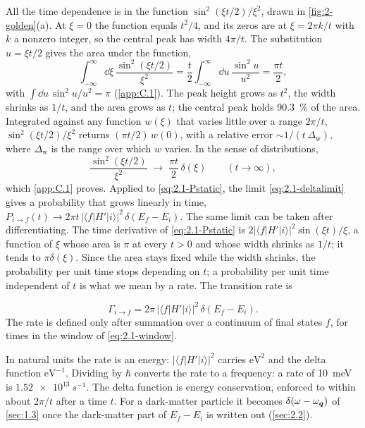 All the time dependence is in the function $\sin^2(\xi t/2)/\xi^2$, drawn in \cref{fig:2-golden}(a). At $\xi = 0$ the function equals $t^2/4$, and its zeros are at $\xi = 2\pi k/t$ with $k$ a nonzero integer, so the central peak has width $4\pi/t$. The substitution $u = \xi t/2$ gives the area under the function,
\begin{equation*}
  \int_{-\infty}^{\infty}\dd\xi\,\frac{\sin^2(\xi t/2)}{\xi^2} = \frac{t}{2}\int_{-\infty}^{\infty}\dd u\,\frac{\sin^2 u}{u^2} = \frac{\pi t}{2} ,
\end{equation*}
with $\int\dd u\,\sin^2u/u^2 = \pi$ (\cref{app:C.1}). The peak height grows as $t^2$, the width shrinks as $1/t$, and the area grows as $t$; the central peak holds \SI{90.3}{\percent} of the area. Integrated against any function $w(\xi)$ that varies little over a range $2\pi/t$, $\sin^2(\xi t/2)/\xi^2$ returns $(\pi t/2)\,w(0)$, with a relative error $\sim 1/(t\,\Delta_{\mathrm{w}})$, where $\Delta_{\mathrm{w}}$ is the range over which $w$ varies. In the sense of distributions,
\begin{equation}
  \frac{\sin^2(\xi t/2)}{\xi^2} \;\longrightarrow\; \frac{\pi t}{2}\,\delta(\xi) \qquad (t \to \infty) ,
  \label{eq:2.1-deltalimit}
\end{equation}
which \cref{app:C.1} proves. Applied to \cref{eq:2.1-Pstatic}, the limit \cref{eq:2.1-deltalimit} gives a probability that grows linearly in time, $P_{i\to f}(t) \to 2\pi t\,|\langle f|H'|i\rangle|^2\,\delta(E_f - E_i)$. The same limit can be taken after differentiating. The time derivative of \cref{eq:2.1-Pstatic} is $2|\langle f|H'|i\rangle|^2\sin(\xi t)/\xi$, a function of $\xi$ whose area is $\pi$ at every $t > 0$ and whose width shrinks as $1/t$; it tends to $\pi\delta(\xi)$. Since the area stays fixed while the width shrinks, the probability per unit time stops depending on $t$; a probability per unit time independent of $t$ is what we mean by a rate. The transition rate is
\begin{keyresult}
\begin{equation}
  \varGamma_{i\to f} = 2\pi\,|\langle f|H'|i\rangle|^2\,\delta(E_f - E_i) .
  \label{eq:2.1-golden}
\end{equation}
The rate is defined only after summation over a continuum of final states $f$, for times in the window of \cref{eq:2.1-window}.
\end{keyresult}
In natural units the rate is an energy: $|\langle f|H'|i\rangle|^2$ carries $\mathrm{eV}^2$ and the delta function $\mathrm{eV}^{-1}$. Dividing by $\hbar$ converts the rate to a frequency: a rate of \SI{10}{meV} is $\SI{1.52e13}{s^{-1}}$. The delta function is energy conservation, enforced to within about $2\pi/t$ after a time $t$. For a dark-matter particle it becomes $\delta(\omega - \omega_{\bm{q}})$ of \cref{sec:1.3} once the dark-matter part of $E_f - E_i$ is written out (\cref{sec:2.2}).

